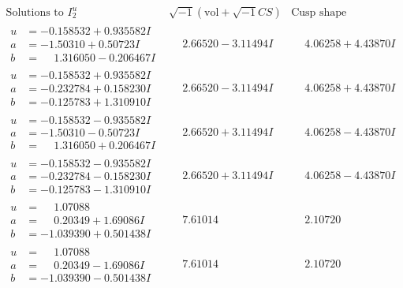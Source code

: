 \documentclass[1p]{elsarticle_modified}
\theoremstyle{definition}
\newcommand{\I}{\sqrt{-1}}
\begin{document}
$$\begin{array}{c|c|c}  
\text{Solutions to }I^u_{2}& \I (\text{vol} + \sqrt{-1}CS) & \text{Cusp shape}\\
 \hline 
\begin{aligned}
u &= -0.158532 + 0.935582 I \\
a &= -1.50310 + 0.50723 I \\
b &= \phantom{-}1.316050 - 0.206467 I\end{aligned}
 & \phantom{-}2.66520 - 3.11494 I & \phantom{-}4.06258 + 4.43870 I \\ \hline\begin{aligned}
u &= -0.158532 + 0.935582 I \\
a &= -0.232784 + 0.158230 I \\
b &= -0.125783 + 1.310910 I\end{aligned}
 & \phantom{-}2.66520 - 3.11494 I & \phantom{-}4.06258 + 4.43870 I \\ \hline\begin{aligned}
u &= -0.158532 - 0.935582 I \\
a &= -1.50310 - 0.50723 I \\
b &= \phantom{-}1.316050 + 0.206467 I\end{aligned}
 & \phantom{-}2.66520 + 3.11494 I & \phantom{-}4.06258 - 4.43870 I \\ \hline\begin{aligned}
u &= -0.158532 - 0.935582 I \\
a &= -0.232784 - 0.158230 I \\
b &= -0.125783 - 1.310910 I\end{aligned}
 & \phantom{-}2.66520 + 3.11494 I & \phantom{-}4.06258 - 4.43870 I \\ \hline\begin{aligned}
u &= \phantom{-}1.07088\phantom{ +0.000000I} \\
a &= \phantom{-}0.20349 + 1.69086 I \\
b &= -1.039390 + 0.501438 I\end{aligned}
 & \phantom{-}7.61014\phantom{ +0.000000I} & \phantom{-}2.10720\phantom{ +0.000000I} \\ \hline\begin{aligned}
u &= \phantom{-}1.07088\phantom{ +0.000000I} \\
a &= \phantom{-}0.20349 - 1.69086 I \\
b &= -1.039390 - 0.501438 I\end{aligned}
 & \phantom{-}7.61014\phantom{ +0.000000I} & \phantom{-}2.10720\phantom{ +0.000000I} \\ \hline\begin{aligned}

\end{aligned}
\end{array}$$
\end{document}
